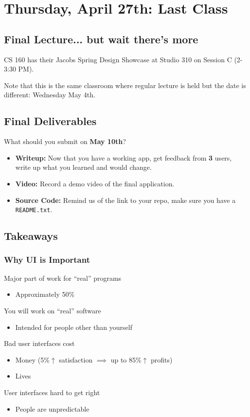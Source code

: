 \section{Thursday, April 27th: Last Class}
\subsection{Final Lecture... but wait there's more}
CS 160 has their Jacobs Spring Design Showcase at Studio 310 on Session C (2-3:30 PM).

Note that this is the same classroom where regular lecture is held but the date is different: Wednesday May 4th.

\subsection{Final Deliverables}
What should you submit on \textbf{May 10th}?
\begin{itemize}
    \item \textbf{Writeup:} Now that you have a working app, get feedback from \textbf{3} users, write up what you learned and would change.
    \item \textbf{Video:} Record a demo video of the final application.
    \item \textbf{Source Code:} Remind us of the link to your repo, make sure you have a \texttt{README.txt}.
\end{itemize}

\subsection{Takeaways}
\subsubsection{Why UI is Important}
Major part of work for ``real'' programs
\begin{itemize}
    \item Approximately 50\%
\end{itemize}
You will work on “real” software
\begin{itemize}
    \item Intended for people other than yourself
\end{itemize}
Bad user interfaces cost
\begin{itemize}
    \item Money (5\%$\uparrow$ satisfaction $\implies$ up to 85\%$\uparrow$ profits)
    \item Lives
\end{itemize}
User interfaces hard to get right
\begin{itemize}
    \item People are unpredictable
\end{itemize}

